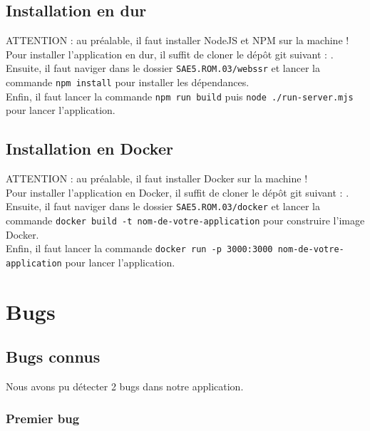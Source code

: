 \documentclass[12pt, a4paper, oneside]{Thesis}
\begin{document}
\subsection{Installation en dur}

ATTENTION : au préalable, il faut installer NodeJS et NPM sur la machine !\\

Pour installer l'application en dur, il suffit de cloner le dépôt git suivant : \url{}{}.\\

Ensuite, il faut naviger dans le dossier \verb|SAE5.ROM.03/webssr| et lancer la commande \verb|npm install| pour installer les dépendances.\\
Enfin, il faut lancer la commande \verb|npm run build| puis \verb|node ./run-server.mjs| pour lancer l'application.\\

\subsection{Installation en Docker}

ATTENTION : au préalable, il faut installer Docker sur la machine !\\

Pour installer l'application en Docker, il suffit de cloner le dépôt git suivant : \url{}{}.\\

Ensuite, il faut naviger dans le dossier \verb|SAE5.ROM.03/docker| et lancer la commande \verb|docker build -t nom-de-votre-application| pour construire l'image Docker.\\

Enfin, il faut lancer la commande \verb|docker run -p 3000:3000 nom-de-votre-application| pour lancer l'application.\\

\newpage

\section{Bugs}

\subsection{Bugs connus}

Nous avons pu détecter 2 bugs dans notre application.\\

\subsubsection{Premier bug}
\end{document}

